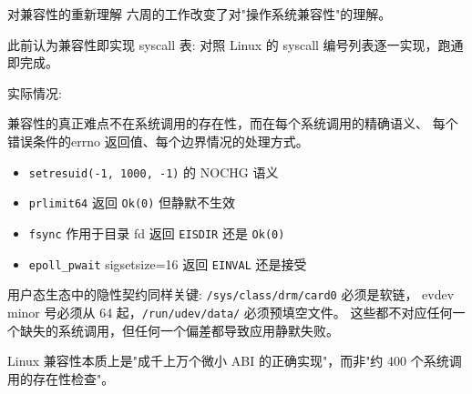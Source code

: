 \documentclass[aspectratio=169,10pt]{ctexbeamer}
\newcommand{\highlight}[1]{\textcolor{accent}{#1}}
\begin{document}
\begin{frame}[shrink=10]{对兼容性的重新理解}
六周的工作改变了对"操作系统兼容性"的理解。

此前认为兼容性即实现 syscall 表: 对照 Linux 的 syscall 编号列表逐一实现，跑通即完成。

\vspace{1mm}
实际情况:

\vspace{1mm}
兼容性的真正难点不在系统调用的\highlight{存在性}，而在每个系统调用的\highlight{精确语义}、
每个错误条件的\highlight{errno 返回值}、每个\highlight{边界情况的处理方式}。

\vspace{1mm}
\begin{itemize}
  \item \texttt{setresuid(-1, 1000, -1)} 的 NOCHG 语义
  \item \texttt{prlimit64} 返回 \texttt{Ok(0)} 但静默不生效
  \item \texttt{fsync} 作用于目录 fd 返回 \texttt{EISDIR} 还是 \texttt{Ok(0)}
  \item \texttt{epoll\_pwait} sigsetsize=16 返回 \texttt{EINVAL} 还是接受
\end{itemize}

\vspace{1mm}
用户态生态中的隐性契约同样关键: \texttt{/sys/class/drm/card0} 必须是软链，
evdev minor 号必须从 64 起，\texttt{/run/udev/data/} 必须预填空文件。
这些都不对应任何一个缺失的系统调用，但任何一个偏差都导致应用静默失败。

\vspace{1mm}
\highlight{Linux 兼容性本质上是"成千上万个微小 ABI 的正确实现"，而非"约 400 个系统调用的存在性检查"。}
\end{frame}

\end{document}
